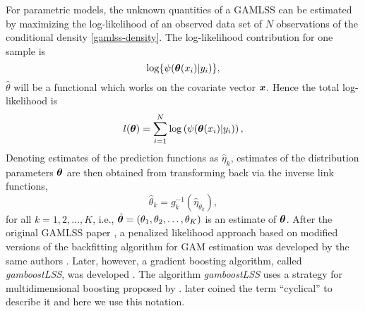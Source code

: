 For parametric models, the unknown quantities of a GAMLSS can be estimated by maximizing the log-likelihood of an observed data set of $N$ observations of the conditional density \eqref{gamlss-density}.
The log-likelihood contribution for one sample is
\begin{equation*}
    \log\{\psi(\boldsymbol{\theta}(x_i)|y_i)\},
\end{equation*}
$\hat{\theta}$ will be a functional which works on the covariate vector $\bm{x}$.
Hence the total log-likelihood is
\begin{equation*}
    l(\boldsymbol{\theta})=\sum_{i=1}^N\log\left(\psi(\boldsymbol{\theta}(x_i)|y_i)\right),
\end{equation*}
Denoting estimates of the prediction functions as $\hat{\eta}_k$, estimates of the distribution parameters $\boldsymbol{\theta}$ are then obtained from transforming back via the inverse link functions,
\begin{equation*}
    \hat{\theta}_k=g_k^{-1}(\hat{\eta}_{\theta_k}),
\end{equation*}
for all $k=1,2,\ldots,K$, i.e., $\hat{\boldsymbol{\theta}}=\left(\theta_1,\theta_2,\ldots,\theta_K\right)$ is an estimate of $\boldsymbol{\theta}$.
After the original GAMLSS paper \citep{gamlss}, a penalized likelihood approach based on modified versions of the backfitting algorithm for GAM estimation was developed by the same authors \citep{gamlssR}.
Later, however, a gradient boosting algorithm, called \textit{gamboostLSS}, was developed \citep{gamboostlss-paper}.
The algorithm \textit{gamboostLSS} uses a strategy for multidimensional boosting proposed by \citet{schmid}.
\citet{thomas2018} later coined the term ``cyclical'' to describe it and here we use this notation.

